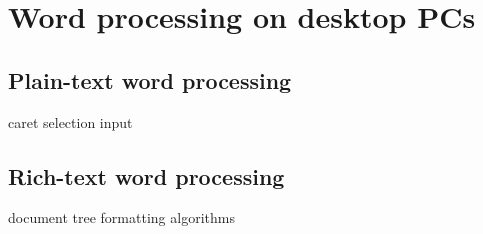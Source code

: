 \chapter{Word processing on desktop PCs}

\section{Plain-text word processing}

caret
selection
input

\section{Rich-text word processing}

document tree
formatting algorithms


